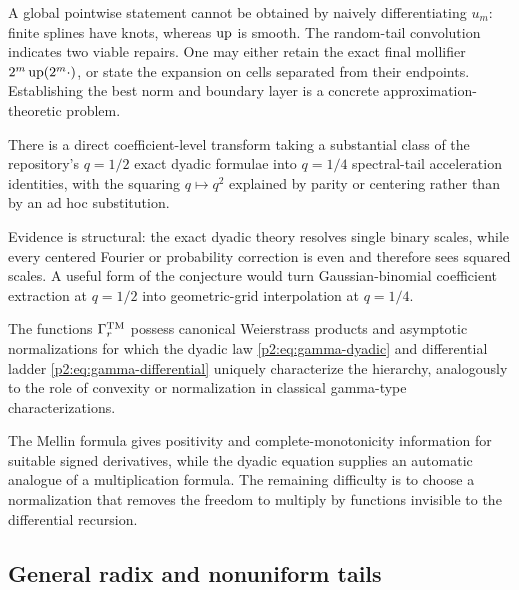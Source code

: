\documentclass[11pt,oneside]{article}
\numberwithin{equation}{section}
\theoremstyle{definition}
\theoremstyle{remark}
\begin{document}
A global pointwise statement cannot be obtained by naively differentiating $u_m$: finite
splines have knots, whereas $\operatorname{up}$ is smooth.  The random-tail convolution indicates two viable
repairs.  One may either retain the exact final mollifier $2^m\operatorname{up}(2^m\cdot)$, or state the
expansion on cells separated from their endpoints.  Establishing the best norm and boundary
layer is a concrete approximation-theoretic problem.

\begin{conjecture}
\label{p2:conj:dual-q}
There is a direct coefficient-level transform taking a substantial class of the repository's
$q=1/2$ exact dyadic formulae into $q=1/4$ spectral-tail acceleration identities, with the
squaring $q\mapsto q^2$ explained by parity or centering rather than by an ad hoc substitution.
\end{conjecture}

Evidence is structural: the exact dyadic theory resolves single binary scales, while every
centered Fourier or probability correction is even and therefore sees squared scales.  A
useful form of the conjecture would turn Gaussian-binomial coefficient extraction at
$q=1/2$ into geometric-grid interpolation at $q=1/4$.

\begin{conjecture}
\label{p2:conj:automatic-Barnes}
The functions $\Gamma_r^{\rm TM}$ possess canonical Weierstrass products and asymptotic
normalizations for which the dyadic law \eqref{p2:eq:gamma-dyadic} and differential ladder
\eqref{p2:eq:gamma-differential} uniquely characterize the hierarchy, analogously to the role of
convexity or normalization in classical gamma-type characterizations.
\end{conjecture}

The Mellin formula gives positivity and complete-monotonicity information for suitable signed
derivatives, while the dyadic equation supplies an automatic analogue of a multiplication
formula.  The remaining difficulty is to choose a normalization that removes the freedom to
multiply by functions invisible to the differential recursion.

\subsection{General radix and nonuniform tails}
\end{document}
